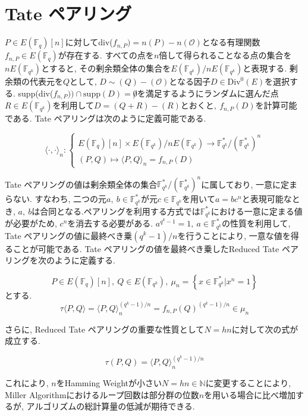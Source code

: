 \section{Tate ペアリング}
\par
$P \in E(\mathbb{F}_q)[n]$に対してdiv($f_{n, P})=n(P)-n(\mathcal{O})$となる有理関数$f_{n,P} \in E(\mathbb{F}_q)$が存在する. すべての点を$n$倍して得られることなる点の集合を$nE(\mathbb{F}_{q^k})$とすると, その剰余類全体の集合を$E(\mathbb{F}_{q^k})/nE(\mathbb{F}_{q^k})$と表現する. 剰余類の代表元を$Q$として, $D \sim (Q) - (\mathcal{O})$となる因子$D \in \mbox{Div}^0(E)$を選択する. supp(div($f_{n, P})) \cap \mbox{supp} (D) = \not 0$を満足するようにランダムに選んだ点$R \in E(\mathbb{F}_{q^k})$を利用して$D=(Q + R) - (R)とおくと,\ f_{n,P}(D)$を計算可能である. Tate ペアリングは次のように定義可能である.
\par
\[
\langle \cdot,\cdot\rangle_n:
\left\{
\begin{array}{l}
E(\mathbb{F}_q)[n] \times E(\mathbb{F}_{q^k})/nE(\mathbb{F}_{q^k}) \to \mathbb{F}_{q^k}^\ast /(\mathbb{F}_{q^k}^\ast)^n\\
(P,Q) \mapsto \langle P, Q \rangle _n = f_{n,P}(D)
\end{array}
\right.
\]
\par
Tate ペアリングの値は剰余類全体の集合$\mathbb{F}_{q^k}^\ast/(\mathbb{F}_{q^k}^\ast)^n$に属しており, 一意に定まらない. すなわち, 二つの元$a,\ b \in \mathbb{F}_{q^k}^\ast が元c \in \mathbb{F}_{q^k}を用いてa = bc^n$と表現可能なとき, $a,\ b$は合同となる.ペアリングを利用する方式では$\mathbb{F}_{q^k}^\ast$における一意に定まる値が必要がため, $c^n$を消去する必要がある. $a^{q^k - 1} = 1,\ a \in \mathbb{F}_{q^k}^\ast$の性質を利用して, Tate ペアリングの値に最終べき乗$(q^k - 1) / n$を行うことにより, 一意な値を得ることが可能である. Tate ペアリングの値を最終べき乗したReduced Tate ペアリングを次のように定義する.
\par
\[
P \in E(\mathbb{F}_q)[n],\ Q \in E(\mathbb{F}_{q^k}),\ \mu_n = \left\{ x \in \mathbb{F}_{q^k}^\ast | x^n = 1 \right\}
\]
とする. \\
\[
\tau \langle P,Q \rangle = \langle P,Q \rangle _n^{(q^k - 1) / n} = f_{n,P}(Q)^{(q^k - 1) / n} \in \mu_n
\]
\par
さらに, Reduced Tate ペアリングの重要な性質として$N = hn$に対して次の式が成立する.
\par
\[
\tau(P,Q) = \langle P,Q \rangle _n^{(q^k - 1) / n}
\]
\par
これにより, $n$をHamming Weightが小さい$N = hn \in \mathbb{N}$に変更することにより, Miller Algorithmにおけるループ回数は部分群の位数$n$を用いる場合に比べ増加するが, アルゴリズムの総計算量の低減が期待できる.
